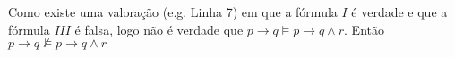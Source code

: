 \documentclass[11pt,a4paper,oneside]{article}
\begin{document}
\begin{enumerate}
{			Como existe uma valoração (e.g. Linha 7) em que a fórmula $I$ é verdade e que a fórmula $III$ é falsa, logo não é verdade que $p \rightarrow q \models p \rightarrow q \wedge r$. Então $p \rightarrow q \not\models p \rightarrow q \wedge r$
		}
	
\end{enumerate}
\end{document}

